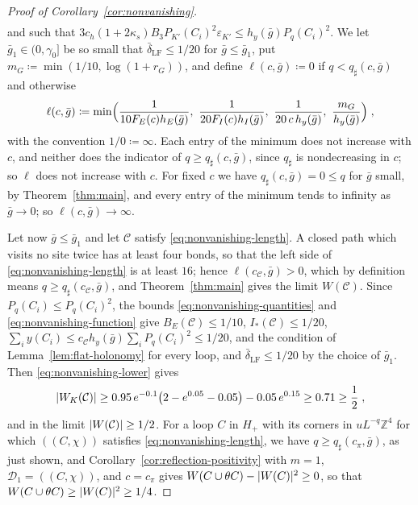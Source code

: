 \documentclass[11pt]{preprint}
\DeclarePairedDelimiter{\abs}{\lvert}{\rvert}
\numberwithin{equation}{section}
\theoremstyle{definition}
\theoremstyle{remark}
\theoremstyle{plain}
\begin{document}
\begin{proof}[Proof of Corollary~\ref{cor:nonvanishing}]
\begin{equation}
\begin{gathered}
\end{gathered}
\end{equation}
and such that $3c_h(1 + 2\kappa_s)B_3P_{K'}(C_i)^2\varepsilon_{K'} \leq h_y(\bar g)P_q(C_i)^2$. We let $\bar g_1 \in (0, \gamma_0]$ be so small that $\bar\delta_{\mathrm{LF}} \leq 1/20$ for $\bar g \leq \bar g_1$, put $m_G \coloneqq \min(1/10, \log(1 + r_G))$, and define $\ell(c, \bar g) \coloneqq 0$ if $q < q_\sharp(c, \bar g)$ and otherwise
\begin{equation}\label{eq:nonvanishing-function}
    \ell(c, \bar g) \coloneqq \min\Bigl(\frac{1}{10F_E(c)h_E(\bar g)},\ \frac{1}{20F_I(c)h_I(\bar g)},\ \frac{1}{20\,c\,h_y(\bar g)},\ \frac{m_G}{h_y(\bar g)}\Bigr)\;,
\end{equation}
with the convention $1/0 \coloneqq \infty$. Each entry of the minimum does not increase with $c$, and neither does the indicator of $q \geq q_\sharp(c, \bar g)$, since $q_\sharp$ is nondecreasing in $c$; so $\ell$ does not increase with $c$. For fixed $c$ we have $q_\sharp(c, \bar g) = 0 \leq q$ for $\bar g$ small, by Theorem~\ref{thm:main}, and every entry of the minimum tends to infinity as $\bar g \to 0$; so $\ell(c, \bar g) \to \infty$.

Let now $\bar g \leq \bar g_1$ and let $\mathcal C$ satisfy \eqref{eq:nonvanishing-length}. A closed path which visits no site twice has at least four bonds, so that the left side of \eqref{eq:nonvanishing-length} is at least $16$; hence $\ell(c_{\mathcal C}, \bar g) > 0$, which by definition means $q \geq q_\sharp(c_{\mathcal C}, \bar g)$, and Theorem~\ref{thm:main} gives the limit $W(\mathcal C)$. Since $P_q(C_i) \leq P_q(C_i)^2$, the bounds \eqref{eq:nonvanishing-quantities} and \eqref{eq:nonvanishing-function} give $B_E(\mathcal C) \leq 1/10$, $I_*(\mathcal C) \leq 1/20$, $\sum_iy(C_i) \leq c_{\mathcal C}h_y(\bar g)\sum_iP_q(C_i)^2 \leq 1/20$, and the condition of Lemma~\ref{lem:flat-holonomy} for every loop, and $\bar\delta_{\mathrm{LF}} \leq 1/20$ by the choice of $\bar g_1$. Then \eqref{eq:nonvanishing-lower} gives
\begin{equation}\label{eq:nonvanishing-number}
    \abs{W_K(\mathcal C)} \geq 0.95\,e^{-0.1}\bigl(2 - e^{0.05} - 0.05\bigr) - 0.05\,e^{0.15} \geq 0.71 \geq \frac12\;,
\end{equation}
and in the limit $\abs{W(\mathcal C)} \geq 1/2$. For a loop $C$ in $H_+$ with its corners in $uL^{-q}\mathbb Z^4$ for which $((C, \chi))$ satisfies \eqref{eq:nonvanishing-length}, we have $q \geq q_\sharp(c_\pi, \bar g)$, as just shown, and Corollary~\ref{cor:reflection-positivity} with $m = 1$, $\mathcal D_1 = ((C, \chi))$, and $c = c_\pi$ gives $W(C \cup \theta C) - \abs{W(C)}^2 \geq 0$, so that $W(C \cup \theta C) \geq \abs{W(C)}^2 \geq 1/4$.
\end{proof}
\end{document}
